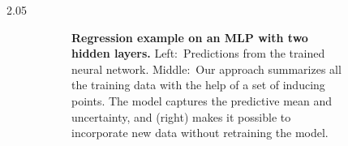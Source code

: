 \documentclass[final,12pt]{beamer}
\newlength{\colwidth}
\newcommand{\our}{SFR}
\begin{document}
\begin{frame}[t]
\begin{columns}[t]
\begin{column}{2.05\colwidth}
\begin{minipage}{\textwidth}
\begin{figure}[t!]
\begin{subfigure}[b]{0.65\textwidth}
    \caption{\footnotesize \textbf{Regression example on an MLP with two hidden layers.} Left:~Predictions from the trained neural network. Middle:~Our approach summarizes all the training data with the help of a set of inducing points. The model captures the predictive mean and uncertainty, and (right) makes it possible to incorporate new data without retraining the model.}
    \label{fig:teaser}
    \end{subfigure}
    \hspace{2cm}
    \begin{subfigure}{0.3\textwidth}\centering
    \centering

\end{subfigure}
\end{figure}
\end{minipage}
\end{column}
\end{columns}
\end{frame}
\end{document}
